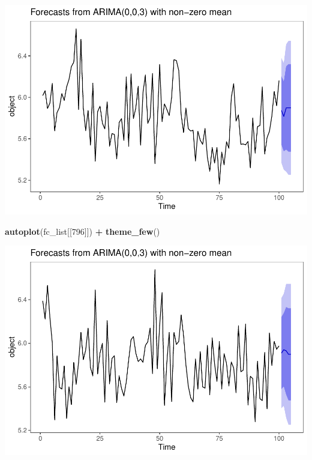 \documentclass[11pt, a4paper]{report}
\newenvironment{Shaded}{\begin{snugshade}}{\end{snugshade}}
\newcommand{\DecValTok}[1]{\textcolor[rgb]{0.00,0.00,0.81}{#1}}
\newcommand{\KeywordTok}[1]{\textcolor[rgb]{0.13,0.29,0.53}{\textbf{#1}}}
\newcommand{\NormalTok}[1]{#1}
\newcommand{\OperatorTok}[1]{\textcolor[rgb]{0.81,0.36,0.00}{\textbf{#1}}}
\newcommand{\StringTok}[1]{\textcolor[rgb]{0.31,0.60,0.02}{#1}}
\theoremstyle{plain}
\theoremstyle{plain}
\theoremstyle{remark}
\begin{document}
\begin{center}\includegraphics{Econo2_P4_files/figure-latex/forecast arima plots-3} \end{center}

\begin{Shaded}
	\begin{Highlighting}[]
		\KeywordTok{autoplot}\NormalTok{(fc_list[[}\DecValTok{796}\NormalTok{]]) }\OperatorTok{+}\StringTok{ }\KeywordTok{theme_few}\NormalTok{()}
	\end{Highlighting}
\end{Shaded}

\begin{center}\includegraphics{Econo2_P4_files/figure-latex/forecast arima plots-4} \end{center}
\end{document}
